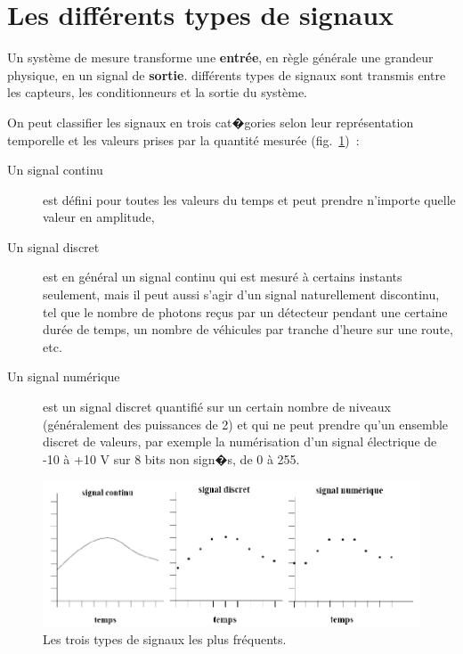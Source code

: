 \section{Les différents types de signaux}

Un système de mesure transforme une \textbf{entrée}, en règle générale une grandeur physique, en un signal de \textbf{sortie}. différents types de signaux sont transmis entre les capteurs, les conditionneurs et la sortie du système.

On peut classifier les signaux en trois cat�gories selon leur représentation temporelle et les valeurs prises par la quantité mesurée (fig.~\ref{fig:typsign})~:
\begin{description}
\item[Un signal continu] est défini pour toutes les valeurs du temps et peut prendre n'importe quelle valeur en amplitude,
\item[Un signal discret] est en général un signal continu qui est mesuré à certains instants seulement, mais il peut aussi s'agir d'un signal naturellement discontinu, tel que le nombre de photons reçus par un détecteur pendant une certaine durée de temps, un nombre de véhicules par tranche d'heure sur une route, etc.
\item[Un signal numérique] est un signal discret quantifié sur un certain nombre de niveaux (généralement des puissances de 2) et qui ne peut prendre qu'un ensemble discret de valeurs, par exemple la numérisation d'un signal électrique de -10 à +10 V sur 8 bits non sign�s, de 0 à 255.
\end{description}
\begin{figure}[h]
   \centering
   \includegraphics[width=16cm]{assets/figures/typesign.pdf}
   \caption{Les trois types de signaux les plus fréquents.}\vspace{5mm}
   \label{fig:typsign}
\end{figure}


